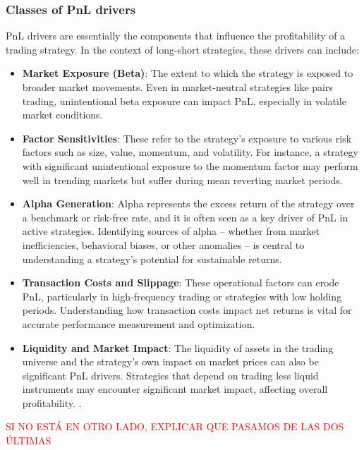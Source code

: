 \subsubsection{Classes of PnL drivers}
\label{sec:classes-pnl-drivers}
PnL drivers are essentially the components that influence the profitability of a trading strategy. In the context of long-short strategies, these drivers can include:
\begin{itemize}
    \item \textbf{Market Exposure (Beta)}: The extent to which the strategy is exposed to broader market movements. Even in market-neutral strategies like pairs trading, unintentional beta exposure can impact PnL, especially in volatile market conditions. \cite{sharpe_1964}
    \item \textbf{Factor Sensitivities}: These refer to the strategy's exposure to various risk factors such as size, value, momentum, and volatility. For instance, a strategy with significant unintentional exposure to the momentum factor may perform well in trending markets but suffer during mean reverting market periods. \cite{asness_moskowitz_lasse_pedersen_2013}
    \item \textbf{Alpha Generation}: Alpha represents the excess return of the strategy over a benchmark or risk-free rate, and it is often seen as a key driver of PnL in active strategies. Identifying sources of alpha -- whether from market inefficiencies, behavioral biases, or other anomalies -- is central to understanding a strategy's potential for sustainable returns. \cite{feibel_2003}
    \item \textbf{Transaction Costs and Slippage}: These operational factors can erode PnL, particularly in high-frequency trading or strategies with low holding periods. Understanding how transaction costs impact net returns is vital for accurate performance measurement and optimization. \cite{gerhold_guasoni_muhle_2013}
    \item \textbf{Liquidity and Market Impact}: The liquidity of assets in the trading universe and the strategy's own impact on market prices can also be significant PnL drivers. Strategies that depend on trading less liquid instruments may encounter significant market impact, affecting overall profitability. \cite{tarun_chordia_roll_avanidhar_subrahmanyam_2001}.
\end{itemize}
\textcolor{red}{SI NO ESTÁ EN OTRO LADO, EXPLICAR QUE PASAMOS DE LAS DOS ÚLTIMAS}

